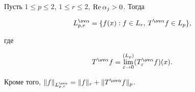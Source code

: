 \begin{thm}


Пусть $1\le p\le 2$, $1\le r\le 2$, $\operatorname{Re}\alpha_j>0$. Тогда


\begin{equation}


\spaceL=\{f(x):f\in L_r,\,


T^{\ov\alpha}f\in L_p\},


\end{equation}


где


\begin{equation}


T^{\ov\alpha}f=\overset{(L_p)}{\lim_{\varepsilon\to 0}}{}


(T^{\ov\alpha}_\varepsilon f)(x).


\end{equation}


Кроме того, $\|f\|_{\spaceL}=\|f\|_r+\|T^{\ov\alpha}f\|_p$.


\end{thm}





